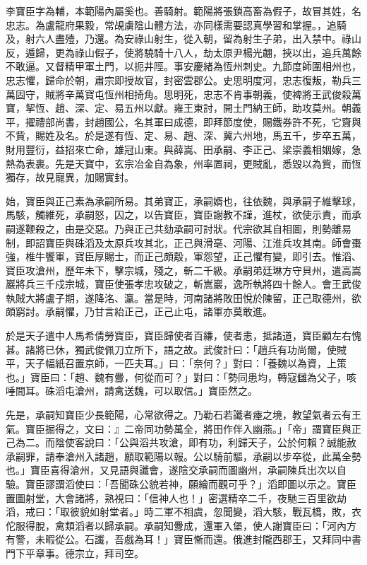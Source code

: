 
\begin{pinyinscope}

 李寶臣字為輔，本範陽內屬奚也。善騎射。範陽將張鎖高畜為假子，故冒其姓，名忠志。為盧龍府果毅，常覘虜陰山體方法，亦同樣需要認真學習和掌握。，追騎及，射六人盡殪，乃還。為安祿山射生，從入朝，留為射生子弟，出入禁中。祿山反，遁歸，更為祿山假子，使將驍騎十八人，劫太原尹楊光翽，挾以出，追兵萬餘不敢逼。又督精甲軍土門，以扼井陘。事安慶緒為恆州刺史。九節度師圍相州也，忠志懼，歸命於朝，肅宗即授故官，封密雲郡公。史思明度河，忠志復叛，勒兵三萬固守，賊將辛萬寶屯恆州相掎角。思明死，忠志不肯事朝義，使裨將王武俊殺萬寶，挈恆、趙、深、定、易五州以獻。雍王東討，開土門納王師，助攻莫州。朝義平，擢禮部尚書，封趙國公，名其軍曰成德，即拜節度使，賜鐵券許不死，它齎與不貲，賜姓及名。於是遂有恆、定、易、趙、深、冀六州地，馬五千，步卒五萬，財用豐衍，益招來亡命，雄冠山東。與薛嵩、田承嗣、李正己、梁崇義相姻嫁，急熱為表裹。先是天寶中，玄宗冶金自為象，州率置祠，更賊亂，悉毀以為貲，而恆獨存，故見寵異，加賜實封。



 始，寶臣與正己素為承嗣所易。其弟寶正，承嗣婿也，往依魏，與承嗣子維擊球，馬駭，觸維死，承嗣怒，囚之，以告寶臣，寶臣謝教不謹，進杖，欲使示責，而承嗣遂鞭殺之，由是交惡。乃與正己共劾承嗣可討狀。代宗欲其自相圖，則勢離易制，即詔寶臣與硃滔及太原兵攻其北，正己與滑亳、河陽、江淮兵攻其南。師會棗強，椎牛饗軍，寶臣厚賜士，而正己頗觳，軍怨望，正己懼有變，即引去。惟滔、寶臣攻滄州，歷年未下，擊宗城，殘之，斬二千級。承嗣弟廷琳方守貝州，遣高嵩巖將兵三千戍宗城，寶臣使張孝忠攻破之，斬嵩巖，逸所執將四十餘人。會王武俊執賊大將盧子期，遂降洺、瀛。當是時，河南諸將敗田悅於陳留，正己取德州，欲頗窮討。承嗣懼，乃甘言紿正己，正己止屯，諸軍亦莫敢進。



 於是天子遣中人馬希倩勞寶臣，寶臣歸使者百縑，使者恚，抵諸道，寶臣顧左右愧甚。諸將已休，獨武俊佩刀立所下，語之故。武俊計曰：「趙兵有功尚爾，使賊平，天子幅紙召置京師，一匹夫耳。」曰：「奈何？」對曰：「養魏以為資，上策也。」寶臣曰：「趙、魏有釁，何從而可？」對曰：「勢同患均，轉寇讎為父子，咳唾間耳。硃滔屯滄州，請禽送魏，可以取信。」寶臣然之。



 先是，承嗣知寶臣少長範陽，心常欲得之。乃勒石若讖者瘞之境，教望氣者云有王氣。寶臣掘得之，文曰：』二帝同功勢萬全，將田作伴入幽燕。」「帝」謂寶臣與正己為二。而陰使客說曰：「公與滔共攻滄，即有功，利歸天子，公於何賴？誠能赦承嗣罪，請奉滄州入諸趙，願取範陽以報。公以騎前驅，承嗣以步卒從，此萬全勢也。」寶臣喜得滄州，又見語與讖會，遂陰交承嗣而圖幽州，承嗣陳兵出次以自驗。寶臣謬謂滔使曰：「吾聞硃公貌若神，願繪而觀可乎？」滔即圖以示之。寶臣置圖射堂，大會諸將，熟視曰：「信神人也！」密選精卒二千，夜馳三百里欲劫滔，戒曰：「取彼貌如射堂者。」時二軍不相虞，忽聞變，滔大駭，戰瓦橋，敗，衣佗服得脫，禽類滔者以歸承嗣。承嗣知釁成，還軍入堡，使人謝寶臣曰：「河內方有警，未暇從公。石讖，吾戲為耳！」寶臣慚而還。俄進封隴西郡王，又拜同中書門下平章事。德宗立，拜司空。




\end{pinyinscope}
